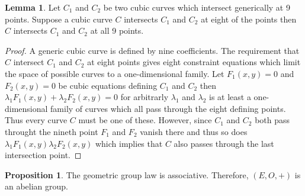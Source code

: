 \documentclass{article}
\theoremstyle{definition}
\newtheorem{lemma}[theorem]{Lemma}
\newtheorem{proposition}[theorem]{Proposition}
\begin{document}
\begin{lemma}
Let $C_1$ and $C_2$ be two cubic curves which intersect generically at 9 points. Suppose a cubic curve $C$ intersects $C_1$ and $C_2$ at eight of the points then $C$ intersects $C_1$ and $C_2$ at all 9 points. 
\end{lemma}

\begin{proof}
A generic cubic curve is defined by nine coefficients. The requirement that $C$ intersect $C_1$ and $C_2$ at eight points gives eight constraint equations which limit the space of possible curves to a one-dimensional family. Let $F_1(x, y) = 0$ and $F_2(x, y) = 0$ be cubic equations defining $C_1$ and $C_2$ then $\lambda_1 F_1(x,y) + \lambda_2 F_2(x,y) = 0$ for arbitrarly $\lambda_1$ and $\lambda_2$ is at least a one-dimensional family of curves which all pass through the eight defining points. Thus every curve $C$ must be one of these. However, since $C_1$ and $C_2$ both pass throught the nineth point $F_1$ and $F_2$ vanish there and thus so does $\lambda_1 F_1(x,y) \lambda_2 F_2(x,y)$ which implies that $C$ also passes through the last intersection point. 
\end{proof}

\begin{proposition}
The geometric group law is associative. Therefore, $(E, O, +)$ is an abelian group. 
\end{proposition}
\end{document}
